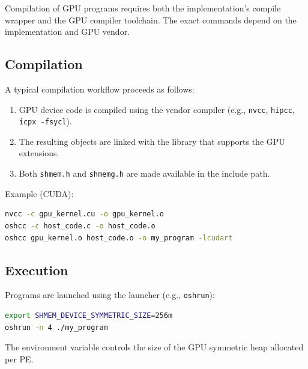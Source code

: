
Compilation of \openshmem GPU programs requires both the \openshmem
implementation's compile wrapper and the GPU compiler toolchain. The exact
commands depend on the implementation and GPU vendor.

\subsection*{Compilation}

A typical compilation workflow proceeds as follows:

\begin{enumerate}
\item GPU device code is compiled using the vendor compiler (e.g., \texttt{nvcc},
  \texttt{hipcc}, \texttt{icpx -fsycl}).
\item The resulting objects are linked with the \openshmem library that supports
  the GPU extensions.
\item Both \texttt{shmem.h} and \texttt{shmemg.h} are made available in the
  include path.
\end{enumerate}

Example (CUDA):
\begin{lstlisting}[language=bash,style=SourceListingsDefault]
nvcc -c gpu_kernel.cu -o gpu_kernel.o
oshcc -c host_code.c -o host_code.o
oshcc gpu_kernel.o host_code.o -o my_program -lcudart
\end{lstlisting}

\subsection*{Execution}

Programs are launched using the \openshmem launcher (e.g., \texttt{oshrun}):
\begin{lstlisting}[language=bash,style=SourceListingsDefault]
export SHMEM_DEVICE_SYMMETRIC_SIZE=256m
oshrun -n 4 ./my_program
\end{lstlisting}

The  environment variable controls the
size of the \ac{GPU} symmetric heap allocated per \ac{PE}.

\clearpage

